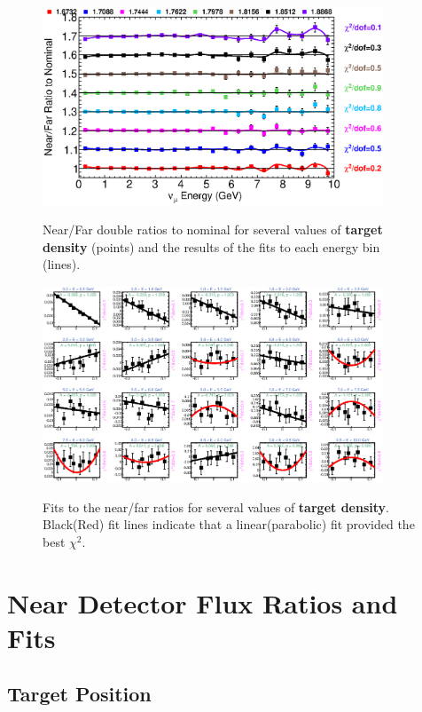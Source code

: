 \begin{figure}[ht]
  \begin{center}
    {\includegraphics[width=4.0in]{figures/Density__nof_summary.eps}}
  \end{center}
\caption{ Near/Far double ratios to nominal for several values of {\bf target density} (points) and the results of the fits to each energy bin (lines).}
\end{figure}

\begin{figure}[hb]
  \begin{center}
    {\includegraphics[width=4.0in]{figures/Density__nof_fits.eps}}
  \end{center}
\caption{ Fits to the near/far ratios for several values of {\bf target density}. Black(Red) fit lines indicate that a linear(parabolic) fit provided the best $\chi^2$. }
\end{figure}

\section{Near Detector Flux Ratios and Fits}
\label{app:near_plots}

\subsection{Target Position}

